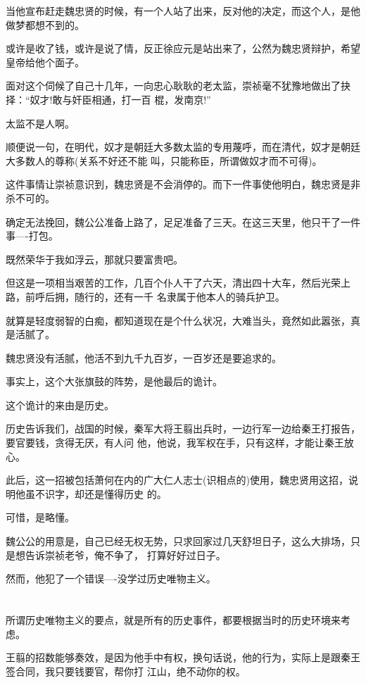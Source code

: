 \documentclass[11pt,a4paper,onecolumn]{article}
\begin{document}
当他宣布赶走魏忠贤的时候，有一个人站了出来，反对他的决定，而这个人，是他做梦都想不到的。

或许是收了钱，或许是说了情，反正徐应元是站出来了，公然为魏忠贤辩护，希望皇帝给他个面子。

面对这个伺候了自己十几年，一向忠心耿耿的老太监，崇祯毫不犹豫地做出了抉择：``奴才!敢与奸臣相通，打一百
棍，发南京!''

太监不是人啊。

顺便说一句，在明代，奴才是朝廷大多数太监的专用蔑呼，而在清代，奴才是朝廷大多数人的尊称(关系不好还不能
叫，只能称臣，所谓做奴才而不可得)。

这件事情让崇祯意识到，魏忠贤是不会消停的。而下一件事使他明白，魏忠贤是非杀不可的。

确定无法挽回，魏公公准备上路了，足足准备了三天。在这三天里，他只干了一件事----打包。

既然荣华于我如浮云，那就只要富贵吧。

但这是一项相当艰苦的工作，几百个仆人干了六天，清出四十大车，然后光荣上路，前呼后拥，随行的，还有一千
名隶属于他本人的骑兵护卫。

就算是轻度弱智的白痴，都知道现在是个什么状况，大难当头，竟然如此嚣张，真是活腻了。

魏忠贤没有活腻，他活不到九千九百岁，一百岁还是要追求的。

事实上，这个大张旗鼓的阵势，是他最后的诡计。

这个诡计的来由是历史。

历史告诉我们，战国的时候，秦军大将王翦出兵时，一边行军一边给秦王打报告，要官要钱，贪得无厌，有人问
他，他说，我军权在手，只有这样，才能让秦王放心。

此后，这一招被包括萧何在内的广大仁人志士(识相点的)使用，魏忠贤用这招，说明他虽不识字，却还是懂得历史
的。

可惜，是略懂。

魏公公的用意是，自己已经无权无势，只求回家过几天舒坦日子，这么大排场，只是想告诉崇祯老爷，俺不争了，
打算好好过日子。

然而，他犯了一个错误----没学过历史唯物主义。

\section[\thesection]{}

所谓历史唯物主义的要点，就是所有的历史事件，都要根据当时的历史环境来考虑。

王翦的招数能够奏效，是因为他手中有权，换句话说，他的行为，实际上是跟秦王签合同，我只要钱要官，帮你打
江山，绝不动你的权。
\end{document}
